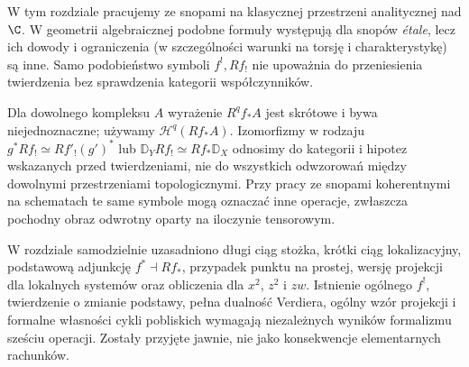 \begin{uwaga}
W tym rozdziale pracujemy ze snopami na klasycznej przestrzeni
analitycznej nad $\C$. W geometrii algebraicznej podobne formuły
występują dla snopów \emph{étale}, lecz ich dowody i ograniczenia
(w szczególności warunki na torsję i charakterystykę) są inne.
Samo podobieństwo symboli $f^!,Rf_!$ nie upoważnia do
przeniesienia twierdzenia bez sprawdzenia kategorii współczynników.
\end{uwaga}
\begin{uwaga}
Dla dowolnego kompleksu $A$ wyrażenie $R^qf_*A$ jest
skrótowe i bywa niejednoznaczne; używamy
$\mathcal H^q(Rf_*A)$. Izomorfizmy w rodzaju
$g^*Rf_!\simeq Rf'_!(g')^*$ lub
$\mathbb D_YRf_!\simeq Rf_*\mathbb D_X$ odnosimy do
kategorii i hipotez wskazanych przed twierdzeniami,
nie do wszystkich odwzorowań między dowolnymi
przestrzeniami topologicznymi. Przy pracy ze snopami
koherentnymi na schematach te same symbole mogą oznaczać
inne operacje, zwłaszcza pochodny obraz odwrotny
oparty na iloczynie tensorowym.
\end{uwaga}
\begin{uwaga}
W rozdziale samodzielnie uzasadniono długi ciąg stożka,
krótki ciąg lokalizacyjny, podstawową adjunkcję $f^*\dashv Rf_*$,
przypadek punktu na prostej, wersję projekcji dla
lokalnych systemów oraz obliczenia dla $x^2$, $z^2$ i $zw$.
Istnienie ogólnego $f^!$, twierdzenie o zmianie podstawy,
pełna dualność Verdiera, ogólny wzór projekcji i formalne
własności cykli pobliskich wymagają niezależnych wyników
formalizmu sześciu operacji. Zostały przyjęte jawnie,
nie jako konsekwencje elementarnych rachunków.
\end{uwaga}

